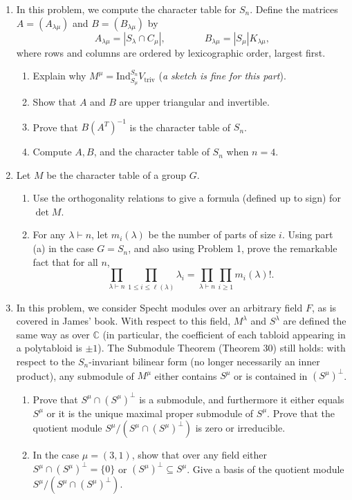 \documentclass[12pt]{article}
\newcommand{\C}{\mathbb{C}}
\renewcommand{\t}[1]{\text{#1}}
\newcommand{\Ind}{\text{Ind}}
\begin{document}
\begin{enumerate}

\item[1.] In this problem, we compute the character table for $S_n$. Define the matrices $A = (A_{\lambda\mu})$ and $B = (B_{\lambda\mu})$ by
\[
A_{\lambda\mu} = |S_\lambda\cap C_\mu|, \qquad\qquad B_{\lambda\mu} = |S_\mu|K_{\lambda\mu},
\]
where rows and columns are ordered by lexicographic order, largest first.

\begin{enumerate}
    \item Explain why $M^\mu = \Ind_{S_\mu}^{S_n} V_{\t{triv}}$ (\emph{a sketch is fine for this part}).
    \item Show that $A$ and $B$ are upper triangular and invertible.
    \item Prove that $B(A^T)^{-1}$ is the character table of $S_n$.
    \item Compute $A,B$, and the character table of $S_n$ when $n=4$.
\end{enumerate}


\item[2.] Let $M$ be the character table of a group $G$.

\begin{enumerate}
\item Use the orthogonality relations to give a formula (defined up to sign) for $\det M$.

\item For any $\lambda\vdash n$, let $m_i(\lambda)$ be the number of parts of size $i$. Using part (a) in the case $G=S_n$, and also using Problem 1, prove the remarkable fact that for all $n$,
\[
\prod_{\lambda\vdash n} \prod_{1\le i\le \ell(\lambda)} \lambda_i = \prod_{\lambda\vdash n} \prod_{i\ge 1} m_i(\lambda)!.
\]
\end{enumerate}


\item[3.] In this problem, we consider Specht modules over an arbitrary field $F$, as is covered in James' book. With respect to this field, $M^\lambda$ and $S^\lambda$ are defined the same way as over $\C$ (in particular, the coefficient of each tabloid appearing in a polytabloid is $\pm 1$). The Submodule Theorem (Theorem 30) still holds: with respect to the $S_n$-invariant bilinear form (no longer necessarily an inner product), any submodule of $M^\mu$ either contains $S^\mu$ or is contained in $(S^\mu)^\perp$.

\begin{enumerate}
    \item Prove that $S^\mu\cap (S^\mu)^\perp$ is a submodule, and furthermore it either equals $S^\mu$ or it is the unique maximal proper submodule of $S^\mu$. Prove that the quotient module $S^\mu/(S^\mu\cap (S^\mu)^\perp)$ is zero or irreducible.
    \item In the case $\mu = (3,1)$, show that over any field either $S^\mu\cap (S^\mu)^\perp = \{0\}$ or $(S^\mu)^\perp\subseteq S^\mu$. Give a basis of the quotient module $S^\mu/(S^\mu\cap (S^\mu)^\perp)$.
\end{enumerate}


\end{enumerate}
\end{document}

